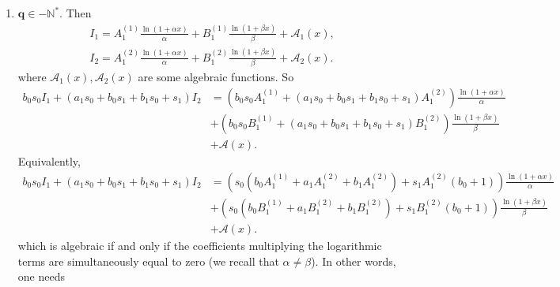 \documentclass[11pt]{article}
\theoremstyle{definition}
\theoremstyle{plain}
\theoremstyle{remark}
\begin{document}
\begin{enumerate}
Each of \( I_1 \), \( I_2 \) can be written in the form
\[
c\underbrace{\int{(1+a_1x+a_2x^2)^qdx}}_{\text{algebraic}} + \tilde{c}\underbrace{\int{x^{-2q-1}(1+a_1x+a_2x^2)^qdx}}_{\text{transcendental}} + \underbrace{C(x)(1+a_1x+a_2x^2)^{q+1}}_{\text{algebraic}},
\]
where the constant $\tilde{c}$ will be denoted as \( \tilde{c}_1 \) (respectively, \( \tilde{c}_2 \)) for \( I_1 \)(respectively, \( I_2 \)). Hence,
\begin{align*}
& b_0s_0 I_1 + (a_1s_0 + b_0s_1 + b_1s_0 + s_1)I_2 \\
&= (b_0s_0\tilde{c}_1 + (a_1s_0 + b_0s_1 + b_1s_0 + s_1)\tilde{c}_2)\int{x^{-2q-1}(1+a_1x+a_2x^2)^qdx} + \mathcal{A}(x).
\end{align*}
where \( \mathcal{A}(x) \) is some algebraic function. Similarly to the previous case, we are in \cref{case:line} and the algorithm returns $(\tilde{c}_2(b_0+1),b_0\tilde{c}_1 + a_1\tilde{c}_2+b_1\tilde{c}_2)$.
\item $\mathbf{q\in -\mathbb{N}^*}$. Then
\begin{align*}
&I_1 = A_1^{(1)} \frac{\ln(1+\alpha x)}{\alpha} + B_1^{(1)} \frac{\ln(1+\beta x)}{\beta} + \mathcal{A}_1(x), \\&
I_2 = A_1^{(2)} \frac{\ln(1+\alpha x)}{\alpha} + B_1^{(2)} \frac{\ln(1+\beta x)}{\beta} + \mathcal{A}_2(x).
\end{align*}
where \( \mathcal{A}_1(x),\mathcal{A}_2(x)  \) are some algebraic functions. So
\begin{align*}
b_0s_0 I_1 + (a_1s_0 + b_0s_1 + b_1s_0 + s_1)I_2 &= 
(b_0s_0A_1^{(1)} + (a_1s_0 + b_0s_1 + b_1s_0 + s_1)A_1^{(2)})\frac{\ln(1+\alpha x)}{\alpha} \\
&+ (b_0s_0B_1^{(1)} + (a_1s_0 + b_0s_1 + b_1s_0 + s_1)B_1^{(2)})\frac{\ln(1+\beta x)}{\beta} \\
&+  \mathcal{A}(x).
\end{align*}
Equivalently,
\begin{align*}
b_0s_0 I_1 + (a_1s_0 + b_0s_1 + b_1s_0 + s_1)I_2 &= 
(s_0(b_0A_1^{(1)} + a_1A_1^{(2)} + b_1A_1^{(2)}) + s_1A_1^{(2)}(b_0+1))\frac{\ln(1+\alpha x)}{\alpha} \\
&+ (s_0(b_0B_1^{(1)} + a_1B_1^{(2)} + b_1B_1^{(2)}) + s_1B_1^{(2)}(b_0+1))\frac{\ln(1+\beta x)}{\beta} \\
&+  \mathcal{A}(x).
\end{align*}
which is algebraic if and only if the coefficients multiplying the logarithmic terms are simultaneously equal to zero (we recall that $\alpha \neq \beta$). In other words, one needs 

\end{enumerate}
\end{document}
